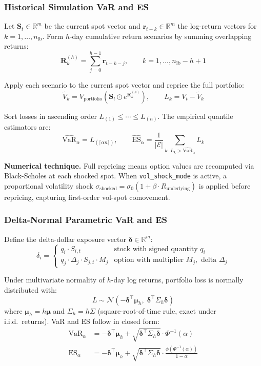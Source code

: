 \documentclass[11pt]{article}
\newcommand{\code}[1]{\texttt{#1}}
\begin{document}
\subsubsection{Historical Simulation VaR and ES}

Let $\mathbf{S}_t \in \mathbb{R}^m$ be the current spot vector and
$\mathbf{r}_{t-k} \in \mathbb{R}^m$ the log-return vectors for
$k=1,\ldots,n_{\mathrm{lb}}$.  Form $h$-day cumulative return scenarios
by summing overlapping returns:
\[
\mathbf{R}_k^{(h)} = \sum_{j=0}^{h-1} \mathbf{r}_{t-k-j},
\qquad k = 1,\ldots,n_{\mathrm{lb}}-h+1
\]

Apply each scenario to the current spot vector and reprice the full
portfolio:
\[
\tilde{V}_k = V_{\text{portfolio}}\!\left(\mathbf{S}_t \odot e^{\mathbf{R}_k^{(h)}}\right),
\qquad L_k = V_t - \tilde{V}_k
\]

Sort losses in ascending order $L_{(1)} \leq \cdots \leq L_{(n)}$.
The empirical quantile estimators are:
\[
\widehat{\mathrm{VaR}}_\alpha = L_{(\lceil\alpha n\rceil)},
\qquad
\widehat{\mathrm{ES}}_\alpha
  = \frac{1}{|\mathcal{E}|}\sum_{k:\,L_k>\widehat{\mathrm{VaR}}_\alpha} L_k
\]

\textbf{Numerical technique.}  Full repricing means option values are
recomputed via Black-Scholes at each shocked spot.  When
\code{vol\_shock\_mode} is active, a proportional volatility shock
$\sigma_{\text{shocked}} = \sigma_0(1 + \beta \cdot R_{\text{underlying}})$
is applied before repricing, capturing first-order vol-spot comovement.

\subsubsection{Delta-Normal Parametric VaR and ES}

Define the delta-dollar exposure vector $\boldsymbol{\delta}\in\mathbb{R}^m$:
\[
\delta_i = \begin{cases}
  q_i \cdot S_{i,t}
    & \text{stock with signed quantity }q_i\\
  q_j \cdot \Delta_j \cdot S_{j,t} \cdot M_j
    & \text{option with multiplier }M_j,\text{ delta }\Delta_j
\end{cases}
\]

Under multivariate normality of $h$-day log returns, portfolio loss is
normally distributed with:
\[
L \sim \mathcal{N}\!\left(
  -\boldsymbol{\delta}^\top\boldsymbol{\mu}_h,\;
  \boldsymbol{\delta}^\top\Sigma_h\boldsymbol{\delta}
\right)
\]
where $\boldsymbol{\mu}_h = h\boldsymbol{\mu}$ and $\Sigma_h = h\Sigma$
(square-root-of-time rule, exact under i.i.d.\ returns).  VaR and ES
follow in closed form:
\begin{align}
\mathrm{VaR}_\alpha
  &= -\boldsymbol{\delta}^\top\boldsymbol{\mu}_h
     + \sqrt{\boldsymbol{\delta}^\top\Sigma_h\boldsymbol{\delta}}
       \cdot\Phi^{-1}(\alpha) \label{eq:pvar}\\
\mathrm{ES}_\alpha
  &= -\boldsymbol{\delta}^\top\boldsymbol{\mu}_h
     + \sqrt{\boldsymbol{\delta}^\top\Sigma_h\boldsymbol{\delta}}
       \cdot\frac{\phi\!\left(\Phi^{-1}(\alpha)\right)}{1-\alpha}
       \label{eq:pes}
\end{align}
\end{document}
